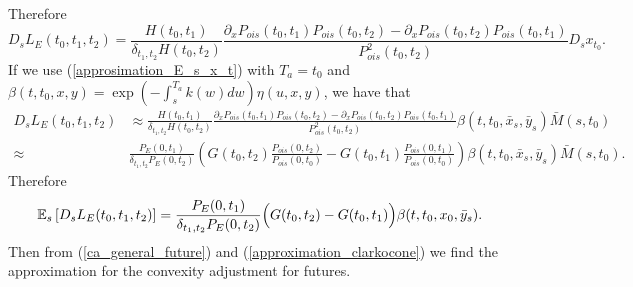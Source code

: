 \documentclass[a4paper,10pt]{article}
\newcommand{\1}{\mathbf{1}}
\begin{document}
Therefore
\begin{equation}\label{malliavin_derive_L}
D_s L_{E}(t_0,t_1,t_2) = \frac{H(t_0,t_1)}{\delta_{t_1,t_2}H(t_0,t_2)}\frac{\partial_{x}P_{ois}(t_0,t_1)P_{ois}(t_0,t_2) - \partial_{x}P_{ois}(t_0,t_2) P_{ois}(t_0,t_1) }{P^{2}_{ois}(t_0,t_2)} D_s x_{t_0}.
\end{equation}
If we use (\ref{approsimation_E_s_x_t}) with $T_a=t_0$ and $\beta(t,t_0,x,y) = \exp\left(-\int_{s}^{T_a}k(w)dw \right) \eta(u,x,y)$, we have that
\begin{align*}
D_s L_{E}(t_0,t_1,t_2) &\approx \frac{H(t_0,t_1)}{\delta_{t_1,t_2}H(t_0,t_2)}\frac{\partial_{x}P_{ois}(t_0,t_1)P_{ois}(t_0,t_2) - \partial_{x}P_{ois}(t_0,t_2) P_{ois}(t_0,t_1)}{P^{2}_{ois}(t_0,t_2)} \beta(t,t_0,\bar{x}_s,\bar{y}_s)\bar{M}(s,t_0) \nonumber \\
\approx& \frac{P_{E}(0,t_1)}{\delta_{t_1,t_2} P_{E}(0,t_2)} \left(G(t_0,t_2) \frac{P_{ois}(0,t_2)}{P_{ois}(0,t_0)} - G(t_0,t_1) \frac{P_{ois}(0,t_1)}{P_{ois}(0,t_0)} \right)\beta(t,t_0,\bar{x}_s,\bar{y}_s)\bar{M}(s,t_0).
\end{align*}
Therefore
\begin{equation}\label{approximation_clarkocone}
\mathbb{E}_s\left[ D_s L_{E}(t_0,t_1,t_2) \right] = \frac{P_{E}(0,t_1)}{\delta_{t_1,t_2} P_{E}(0,t_2)} \Bigl(G(t_0,t_2)  - G(t_0,t_1)\Bigr)\beta(t,t_0,x_0,\bar{y}_s).
\end{equation}
Then from (\ref{ca_general_future}) and (\ref{approximation_clarkocone}) we find the approximation for the convexity adjustment for futures.
\end{document}
